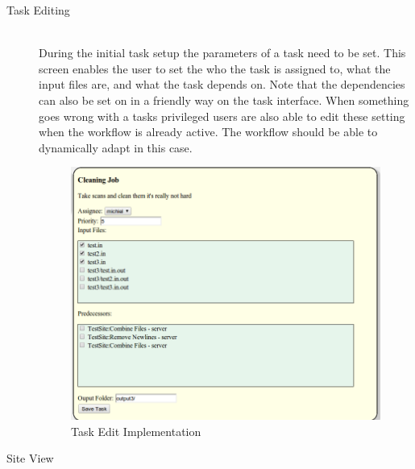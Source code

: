 \documentclass[12pt,a4paper]{report}
\begin{document}
\begin{description}
\item[Task Editing] \hfill \\
    During the initial task setup the parameters of a task need to be set. This screen enables
    the user to set the who the task is assigned to, what the input files are, and what the task
    depends on. Note that the dependencies can also be set on in a friendly way on the task interface.
    When something goes wrong with a tasks privileged users are also able to edit these setting
    when the workflow is already active. The workflow should be able to dynamically adapt in this case.
    \begin{figure}[!h]
        \begin{center}
            \includegraphics[scale=0.35]{figures/task_edit_impl2.png}
        \end{center}
        \caption{Task Edit Implementation}
        \label{task_edit_impl2}
    \end{figure}
\item[Site View] \hfill \\
        \begin{figure}[!h]
        \begin{center}

\end{center}
\end{figure}
\end{description}
\end{document}
